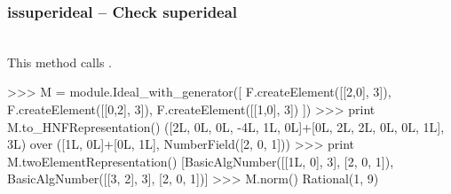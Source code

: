   \subsubsection{issuperideal -- Check superideal}
   \\
   \spacing
   \quad This method calls .\\
   \spacing
\begin{ex}
>>> M = module.Ideal_with_generator([
F.createElement([[2,0], 3]), F.createElement([[0,2], 3]), F.createElement([[1,0], 3])
])
>>> print M.to_HNFRepresentation()
([2L, 0L, 0L, -4L, 1L, 0L]+[0L, 2L, 2L, 0L, 0L, 1L], 3L)
 over
([1L, 0L]+[0L, 1L], NumberField([2, 0, 1]))
>>> print M.twoElementRepresentation()
[BasicAlgNumber([[1L, 0], 3], [2, 0, 1]), BasicAlgNumber([[3, 2], 3], [2, 0, 1])]
>>> M.norm()
Rational(1, 9)
\end{ex}%
\C




